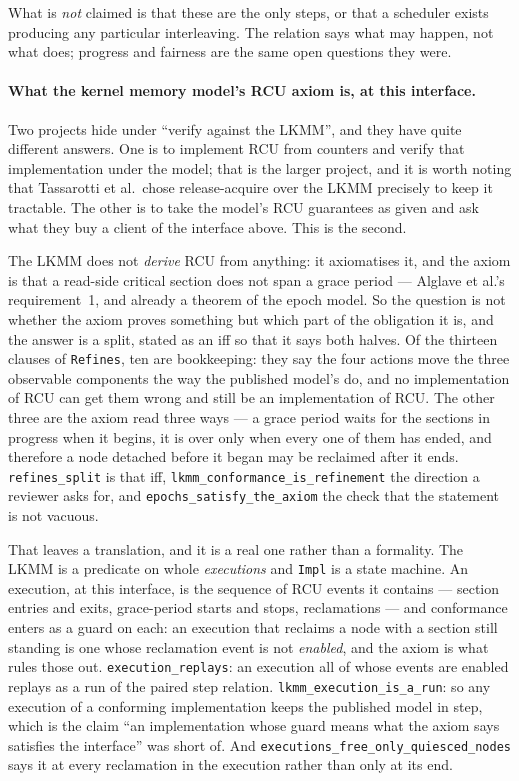 What is \emph{not} claimed is that these are the only steps, or that a
scheduler exists producing any particular interleaving.  The relation says what
may happen, not what does; progress and fairness are the same open questions
they were.

\paragraph{What the kernel memory model's RCU axiom is, at this interface.}
Two projects hide under ``verify against the LKMM'', and they have quite
different answers.  One is to implement RCU from counters and verify that
implementation under the model; that is the larger project, and it is worth
noting that Tassarotti et al.\ chose release-acquire over the LKMM precisely to
keep it tractable.  The other is to take the model's RCU guarantees as given
and ask what they buy a client of the interface above.  This is the second.

The LKMM does not \emph{derive} RCU from anything: it axiomatises it, and the
axiom is that a read-side critical section does not span a grace period ---
Alglave et al.'s requirement~1, and already a theorem of the epoch model.  So
the question is not whether the axiom proves something but which part of the
obligation it is, and the answer is a split, stated as an iff so that it says
both halves.  Of the thirteen clauses of \texttt{Refines}, ten are
bookkeeping: they say the four actions move the three observable components the
way the published model's do, and no implementation of RCU can get them wrong
and still be an implementation of RCU.  The other three are the axiom read
three ways --- a grace period waits for the sections in progress when it
begins, it is over only when every one of them has ended, and therefore a node
detached before it began may be reclaimed after it ends.
\texttt{refines\_split} is that iff, \texttt{lkmm\_conformance\_is\_refinement}
the direction a reviewer asks for, and
\texttt{epochs\_satisfy\_the\_axiom} the check that the statement is not
vacuous.

That leaves a translation, and it is a real one rather than a formality.  The
LKMM is a predicate on whole \emph{executions} and \texttt{Impl} is a state
machine.  An execution, at this interface, is the sequence of RCU events it
contains --- section entries and exits, grace-period starts and stops,
reclamations --- and conformance enters as a guard on each: an execution that
reclaims a node with a section still standing is one whose reclamation event is
not \emph{enabled}, and the axiom is what rules those out.
\texttt{execution\_replays}: an execution all of whose events are enabled
replays as a run of the paired step relation.  \texttt{lkmm\_execution\_is\_a\_run}:
so any execution of a conforming implementation keeps the published model in
step, which is the claim ``an implementation whose guard means what the axiom
says satisfies the interface'' was short of.  And
\texttt{executions\_free\_only\_quiesced\_nodes} says it at every
reclamation in the execution rather than only at its end.


